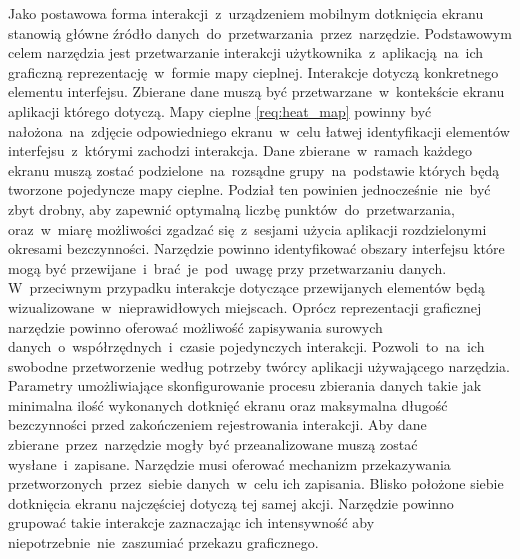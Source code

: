 \begin{enumerate}[label=\textbf{F.\arabic*}]
	 Jako postawowa forma interakcji~z~urządzeniem mobilnym dotknięcia ekranu stanowią główne źródło danych~do~przetwarzania~przez~narzędzie.
	 Podstawowym celem narzędzia jest przetwarzanie interakcji użytkownika~z~aplikacją~na~ich graficzną reprezentację~w~formie mapy cieplnej. 
	 Interakcje dotyczą konkretnego elementu interfejsu. Zbierane dane muszą być przetwarzane~w~kontekście ekranu aplikacji którego dotyczą. Mapy cieplne \ref{req:heat_map} powinny być nałożona~na~zdjęcie odpowiedniego ekranu~w~celu łatwej identyfikacji elementów interfejsu~z~którymi zachodzi interakcja.
	 Dane zbierane~w~ramach każdego ekranu muszą zostać podzielone~na~rozsądne grupy~na~podstawie których będą tworzone pojedyncze mapy cieplne. Podział ten powinien jednocześnie~nie~być zbyt drobny, aby zapewnić optymalną liczbę punktów~do~przetwarzania, oraz~w~miarę możliwości zgadzać się~z~sesjami użycia aplikacji rozdzielonymi okresami bezczynności.
	 Narzędzie powinno identyfikować obszary interfejsu które mogą być przewijane~i~brać~je~pod~uwagę przy przetwarzaniu danych. W~przeciwnym przypadku interakcje dotyczące przewijanych elementów będą wizualizowane~w~nieprawidłowych miejscach.
	 Oprócz reprezentacji graficznej narzędzie powinno oferować możliwość zapisywania surowych danych~o~współrzędnych~i~czasie pojedynczych interakcji. Pozwoli~to~na~ich swobodne przetworzenie według potrzeby twórcy aplikacji używającego narzędzia.
	 Parametry umożliwiające skonfigurowanie procesu zbierania danych takie jak minimalna ilość wykonanych dotknięć ekranu oraz maksymalna długość bezczynności przed zakończeniem rejestrowania interakcji.
	 Aby dane zbierane~przez~narzędzie mogły być przeanalizowane muszą zostać wysłane~i~zapisane. Narzędzie musi oferować mechanizm przekazywania przetworzonych~przez~siebie danych~w~celu ich zapisania.
	 Blisko położone siebie dotknięcia ekranu najczęściej dotyczą tej samej akcji. Narzędzie powinno grupować takie interakcje zaznaczając ich intensywność aby niepotrzebnie~nie~zaszumiać przekazu graficznego.

\end{enumerate}
